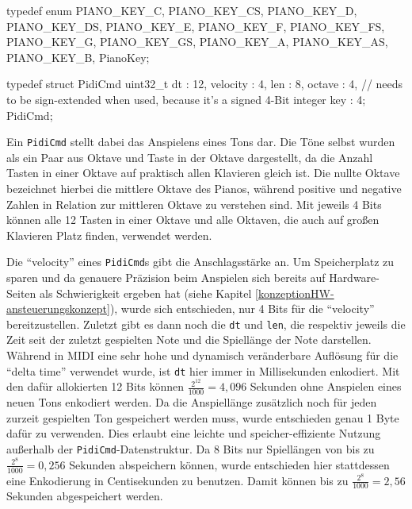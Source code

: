 \begin{UnbrokenCodePage}[style=CStyle, caption={Definition eines \ac{PIDI}-Kommands}, label={code:PidiCmd struct}]
typedef enum {
    PIANO_KEY_C,
    PIANO_KEY_CS,
    PIANO_KEY_D,
    PIANO_KEY_DS,
    PIANO_KEY_E,
    PIANO_KEY_F,
    PIANO_KEY_FS,
    PIANO_KEY_G,
    PIANO_KEY_GS,
    PIANO_KEY_A,
    PIANO_KEY_AS,
    PIANO_KEY_B,
} PianoKey;

typedef struct PidiCmd {
    uint32_t dt : 12,
    velocity    : 4,
    len         : 8,
    octave      : 4, // needs to be sign-extended when used, because it's a signed 4-Bit integer
    key         : 4;
} PidiCmd;
\end{UnbrokenCodePage}

Ein \lstinline{PidiCmd} stellt dabei das Anspielens eines Tons dar.
Die Töne selbst wurden als ein Paar aus Oktave und Taste in der Oktave dargestellt, da die Anzahl Tasten in einer Oktave auf praktisch allen Klavieren gleich ist.
Die nullte Oktave bezeichnet hierbei die mittlere Oktave des Pianos, während positive und negative Zahlen in Relation zur mittleren Oktave zu verstehen sind.
Mit jeweils 4 Bits können alle 12 Tasten in einer Oktave und alle Oktaven, die auch auf großen Klavieren Platz finden, verwendet werden.

Die \enquote{velocity} eines \lstinline{PidiCmd}s gibt die Anschlagsstärke an.
Um Speicherplatz zu sparen und da genauere Präzision beim Anspielen sich bereits auf Hardware-Seiten als Schwierigkeit ergeben hat (siehe Kapitel \ref{konzeptionHW-ansteuerungskonzept}), wurde sich entschieden, nur 4 Bits für die \enquote{velocity} bereitzustellen.
Zuletzt gibt es dann noch die \lstinline{dt} und \lstinline{len}, die respektiv jeweils die Zeit seit der zuletzt gespielten Note und die Spiellänge der Note darstellen.
Während in \ac{MIDI} eine sehr hohe und dynamisch veränderbare Auflösung für die \enquote{delta time} verwendet wurde, ist \lstinline{dt} hier immer in Millisekunden enkodiert.
Mit den dafür allokierten 12 Bits können $\frac{2^{12}}{1000} = 4,096$ Sekunden ohne Anspielen eines neuen Tons enkodiert werden.
Da die Anspiellänge zusätzlich noch für jeden zurzeit gespielten Ton gespeichert werden muss, wurde entschieden genau 1 Byte dafür zu verwenden.
Dies erlaubt eine leichte und speicher-effiziente Nutzung außerhalb der \lstinline{PidiCmd}-Datenstruktur.
Da 8 Bits nur Spiellängen von bis zu $\frac{2^8}{1000} = 0,256$ Sekunden abspeichern können, wurde entschieden hier stattdessen eine Enkodierung in Centisekunden zu benutzen.
Damit können bis zu $\frac{2^8}{1000} = 2,56$ Sekunden abgespeichert werden.

